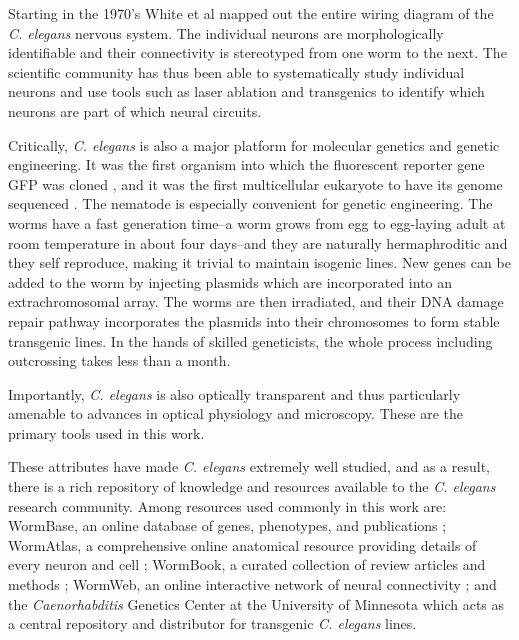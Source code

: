 Starting in the 1970's White et al \citep{white_structure_1976, white_structure_1986}  mapped out the entire wiring diagram of the \textit{C. elegans} nervous system. The individual neurons are morphologically identifiable and their connectivity is stereotyped from one worm to the next. The  scientific community has thus been able to systematically study individual neurons and use tools such as laser ablation and transgenics to identify which neurons are part of which neural circuits. 

Critically, \textit{C. elegans} is also a major platform for molecular genetics and genetic engineering. It was the first organism into which the fluorescent reporter gene GFP was cloned \citep{chalfie_green_1994},  and it was the first multicellular eukaryote to have its genome sequenced \citep{sulston_c._1992,_genome_1998}. The nematode is especially convenient for genetic engineering. The worms have a fast generation time--a worm grows from egg to egg-laying adult at room temperature in about four days--and they are naturally hermaphroditic and they self reproduce,  making it trivial to maintain isogenic lines. New genes can be added to the worm by injecting plasmids which are incorporated into an extrachromosomal array. The worms are then irradiated, and their DNA damage repair pathway incorporates the plasmids into their chromosomes to form stable transgenic lines.  In the hands of skilled geneticists, the whole process including outcrossing takes less than a month. 

Importantly, \textit{C. elegans} is also optically transparent and thus particularly amenable to advances in optical physiology and microscopy. These are the primary tools used in this work. 

These attributes have made  \textit{C. elegans}  extremely well studied, and as a result, there is a rich repository of knowledge and resources available to the \textit{C. elegans} research community. Among resources used commonly in this work are:  WormBase, an online database of genes, phenotypes, and publications \citep{harris_wormbase:_2010}; WormAtlas, a comprehensive online anatomical resource providing details of every neuron and cell \citep{altun_wormatlas_2002}; WormBook, a curated collection of review articles and methods \citep{the_c._elegans_research_community_wormbook_2011}; WormWeb, an online interactive network of neural connectivity \citep{bhatla_c._2009};  and the \textit{Caenorhabditis} Genetics Center at the University of Minnesota which acts as a central repository and distributor for transgenic \textit{C. elegans} lines.


